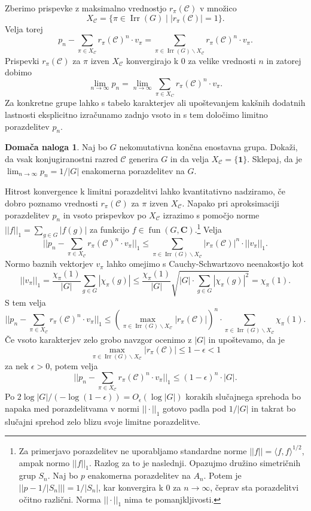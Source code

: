 \documentclass[11pt]{book}
\def\CC{\mathbf{C}}
\def\conclass{\mathcal{C}}
\def\11{\mathbf{1}}
\DeclareMathOperator\Irr{Irr}
\DeclareMathOperator\fun{fun}
\theoremstyle{definition}
\theoremstyle{zgled}
\theoremstyle{odprtproblem}
\theoremstyle{domacanaloga}
\newtheorem*{domacanaloga}{Domača naloga}
\theoremstyle{izrek}
\begin{document}
Zberimo prispevke z maksimalno vrednostjo $r_{\pi}(\conclass)$ v množico
\[
    X_{\conclass} = \{ \pi \in \Irr(G) \mid |r_{\pi}(\conclass)| = 1 \}.
\]
Velja torej
\[
    p_n - \sum_{\pi \in X_{\conclass}} r_{\pi}(\conclass)^n \cdot v_{\pi}
    = \sum_{\pi \in \Irr(G) \backslash X_{\conclass}} r_{\pi}(\conclass)^n \cdot v_{\pi}.
\]
Prispevki $r_{\pi}(\conclass)$ za $\pi$ izven $X_{\conclass}$ konvergirajo k $0$ za velike vrednosti $n$ in zatorej dobimo
\[
    \lim_{n \to \infty} p_n = \lim_{n \to \infty} \sum_{\pi \in X_C} r_{\pi}(\conclass)^n \cdot v_{\pi}.
\]
Za konkretne grupe lahko s tabelo karakterjev ali upoštevanjem kakšnih dodatnih lastnosti eksplicitno izračunamo zadnjo vsoto in s tem določimo limitno porazdelitev $p_n$.

\begin{domacanaloga}
Naj bo $G$ nekomutativna končna enostavna grupa. Dokaži, da vsak konjugiranostni razred $\conclass$ generira $G$ in da velja $X_{\conclass} = \{ \11 \}$. Sklepaj, da je $\lim_{n \to \infty} p_n = 1/|G|$ enakomerna porazdelitev na $G$.
\end{domacanaloga}

Hitrost konvergence k limitni porazdelitvi lahko kvantitativno nadziramo, če dobro poznamo vrednosti $r_{\pi}(\conclass)$ za $\pi$ izven $X_{\conclass}$. Napako pri aproksimaciji porazdelitev $p_n$ in vsoto prispevkov po $X_{\conclass}$ izrazimo s pomočjo norme $||f||_1 = \sum_{g \in G} |f(g)|$ za funkcijo $f \in \fun(G,\CC)$.\footnote{Za primerjavo porazdelitev ne uporabljamo standardne norme $||f|| = \langle f, f \rangle^{1/2}$, ampak normo $||f||_1$. Razlog za to je naslednji. Opazujmo družino simetričnih grup $S_n$. Naj bo $p$ enakomerna porazdelitev na $A_n$. Potem je $||p - 1/|S_n||| = 1/|S_n|$, kar konvergira k $0$ za $n \to \infty$, čeprav sta porazdelitvi očitno različni. Norma $||\cdot||_1$ nima te pomanjkljivosti.} Velja
\[
    || p_n -  \sum_{\pi \in X_{\conclass}} r_{\pi}(\conclass)^n \cdot v_{\pi} ||_1
    \leq
    \sum_{\pi \in \Irr(G) \backslash X_{\conclass}} |r_{\pi}(\conclass)|^n \cdot ||v_{\pi}||_1.
\]
Normo baznih vektorjev $v_{\pi}$ lahko omejimo s Cauchy-Schwartzovo neenakostjo kot
\[
    ||v_{\pi}||_1 = \frac{\chi_{\pi}(1)}{|G|} \sum_{g \in G} |\chi_{\pi}(g)|
    \leq \frac{\chi_{\pi}(1)}{|G|} \sqrt{|G| \cdot \sum_{g \in G} |\chi_{\pi}(g)|^2}
    = \chi_{\pi}(1).
\]
S tem velja
\[
    || p_n -  \sum_{\pi \in X_{\conclass}} r_{\pi}(\conclass)^n \cdot v_{\pi} ||_1
    \leq \left( \max_{\pi \in \Irr(G) \backslash X_{\conclass}} |r_{\pi}(\conclass)| \right)^n  \cdot \sum_{\pi \in \Irr(G) \backslash X_{\conclass}} \chi_{\pi}(1).
\]
Če vsoto karakterjev zelo grobo navzgor ocenimo z $|G|$ in upoštevamo, da je 
\[
    \max_{\pi \in \Irr(G) \backslash X_{\conclass}} |r_{\pi}(\conclass)|  \leq 1 - \epsilon < 1
\]
za nek $\epsilon > 0$, potem velja
\[
    || p_n -  \sum_{\pi \in X_{\conclass}} r_{\pi}(\conclass)^n \cdot v_{\pi} ||_1
    \leq (1 - \epsilon)^n \cdot |G|.
\]
Po $2 \log|G| / (- \log (1 - \epsilon)) = O_{\epsilon}(\log |G|)$ korakih slučajnega sprehoda bo napaka med porazdelitvama v normi $||\cdot||_1$ gotovo padla pod $1/|G|$ in takrat bo slučajni sprehod zelo blizu svoje limitne porazdelitve.
\end{document}
